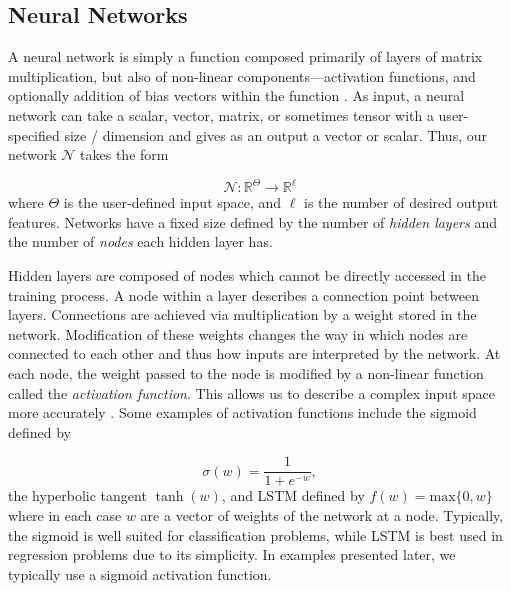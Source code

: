 \documentclass{CUP-JNL-DTM}%
\theoremstyle{definition}
\numberwithin{equation}{section}
\newcommand{\net}{\mathcal{N}}
\newcommand{\Define}{\emph}
\begin{document}
\subsection{Neural Networks}

A neural network is simply a function composed primarily of layers of matrix multiplication, but also of non-linear components---activation functions, and optionally addition of bias vectors within the function \cite{strangLinearAlgebraLearning2019, bishopPatternRecognitionMachine2006}. As input, a neural network can take a scalar, vector, matrix, or sometimes tensor with a user-specified size / dimension and gives as an output a vector or scalar. Thus, our network $\net$ takes the form

\begin{equation}
    \net : \mathbb{R}^{\Theta} \rightarrow \mathbb{R}^{\ell}
\end{equation}
where $\Theta$ is the user-defined input space, and $\ell$ is the number of desired output features. Networks have a fixed size defined by the number of \Define{hidden layers} and the number of \Define{nodes} each hidden layer has. 

Hidden layers are composed of nodes which cannot be directly accessed in the training process. A node within a layer describes a connection point between layers. Connections are achieved via multiplication by a weight stored in the network. Modification of these weights changes the way in which nodes are connected to each other and thus how inputs are interpreted by the network. At each node, the weight passed to the node is modified by a non-linear function called the \Define{activation function}. This allows us to describe a complex input space more accurately \cite{dubeyActivationFunctionsDeep2022a}. Some examples of activation functions include the sigmoid defined by 

\begin{equation}
    \sigma(w) = \frac{1}{1 + e^{-w}},
\end{equation}
the hyperbolic tangent $\tanh(w)$, and LSTM defined by $f(w) = \textrm{max}\{0,w\}$ where in each case $w$ are a vector of weights of the network at a node. Typically, the sigmoid is well suited for classification problems, while LSTM is best used in regression problems due to its simplicity. In examples presented later, we typically use a sigmoid activation function. 
\end{document}
